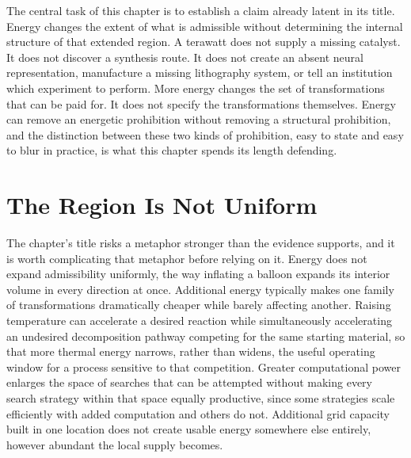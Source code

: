 \documentclass[11pt]{book}
\begin{document}
The central task of this chapter is to establish a claim already latent in its title. Energy changes the extent of what is admissible without determining the internal structure of that extended region. A terawatt does not supply a missing catalyst. It does not discover a synthesis route. It does not create an absent neural representation, manufacture a missing lithography system, or tell an institution which experiment to perform. More energy changes the set of transformations that can be paid for. It does not specify the transformations themselves. Energy can remove an energetic prohibition without removing a structural prohibition, and the distinction between these two kinds of prohibition, easy to state and easy to blur in practice, is what this chapter spends its length defending.

\section{The Region Is Not Uniform}

The chapter's title risks a metaphor stronger than the evidence supports, and it is worth complicating that metaphor before relying on it. Energy does not expand admissibility uniformly, the way inflating a balloon expands its interior volume in every direction at once. Additional energy typically makes one family of transformations dramatically cheaper while barely affecting another. Raising temperature can accelerate a desired reaction while simultaneously accelerating an undesired decomposition pathway competing for the same starting material, so that more thermal energy narrows, rather than widens, the useful operating window for a process sensitive to that competition. Greater computational power enlarges the space of searches that can be attempted without making every search strategy within that space equally productive, since some strategies scale efficiently with added computation and others do not. Additional grid capacity built in one location does not create usable energy somewhere else entirely, however abundant the local supply becomes.
\end{document}
